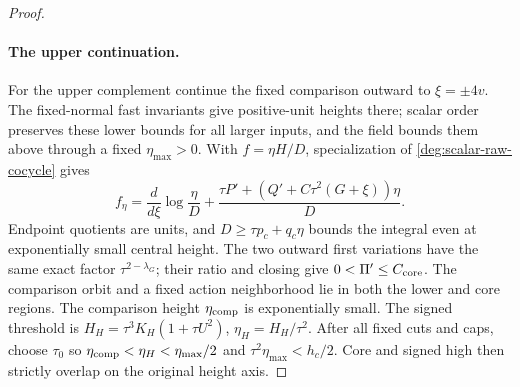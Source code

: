 \begin{proof}
\paragraph{The upper continuation.}
For the upper complement continue the fixed comparison outward to
\(\xi=\pm4v\). The fixed-normal fast invariants give positive-unit
heights there; scalar order preserves these lower bounds for all larger
inputs, and the field bounds them above through a fixed
\(\eta_{\max}>0\). With \(f=\eta H/D\), specialization of
\eqref{deg:scalar-raw-cocycle} gives
\begin{equation}\label{deg:compact-core-variation}
 f_\eta=\frac d{d\xi}\log\frac\eta D+
       \frac{\tau P'+(Q'+C\tau^2(G+\xi))\eta}{D}.
\end{equation}
Endpoint quotients are units, and \(D\ge\tau p_c+q_c\eta\) bounds
the integral even at exponentially small central height. The two outward
first variations have the same exact factor \(\tau^{2-\lambda_G}\);
their ratio and closing give \(0<\Pi'\le C_{\rm core}\).
The comparison orbit and a fixed action neighborhood lie in both the
lower and core regions. The comparison height \(\eta_{\rm comp}\)
is exponentially small.
The signed threshold is
\(H_H=\tau^3K_H(1+\tau U^2)\), \(\eta_H=H_H/\tau^2\).
After all fixed cuts and caps, choose \(\tau_0\) so
\(\eta_{\rm comp}<\eta_H<\eta_{\max}/2\) and
\(\tau^2\eta_{\max}<h_c/2\). Core and signed high then strictly
overlap on the original height axis.


\end{proof}
